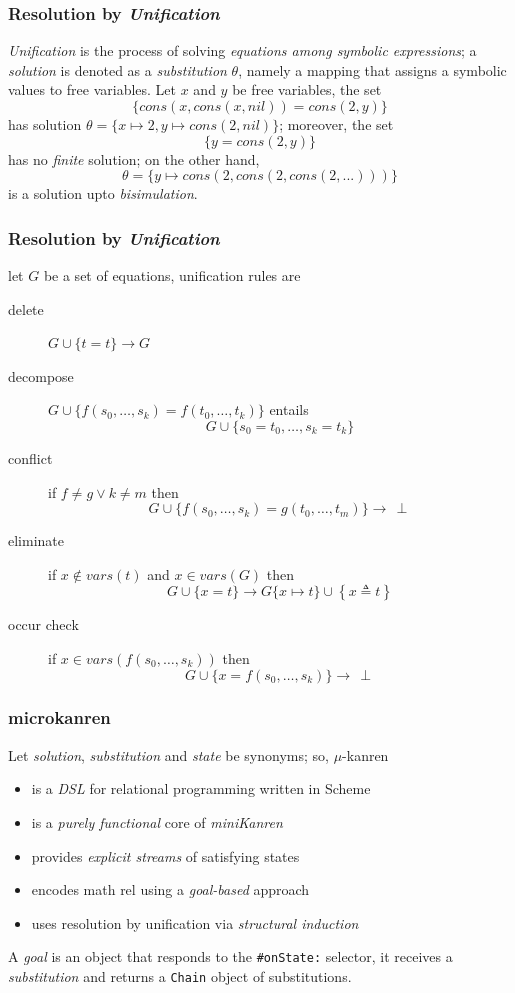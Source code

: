 \documentclass[9pt]{beamer}
\begin{document}
\begin{frame}[fragile]
\frametitle{Resolution by \textit{Unification}}

\textit{Unification} is the process of solving \textit{equations among symbolic
expressions}; a \textit{solution} is denoted as a \textit{substitution}
$\theta$, namely a mapping that assigns a symbolic values to free variables.
\vfill
Let $x$ and $y$ be free variables, the set
$$\lbrace cons(x,cons(x,nil)) = cons(2,y)\rbrace$$
has solution $\theta = \lbrace x \mapsto 2, y \mapsto cons(2,nil) \rbrace$;
moreover, the set
$$ \lbrace y = cons(2,y) \rbrace $$
has no \textit{finite} solution; on the other hand,
$$\theta = \lbrace y \mapsto cons(2,cons(2,cons(2,...))) \rbrace$$
is a solution upto \textit{bisimulation}.
\end{frame}

\begin{frame}[fragile]
\frametitle{Resolution by \textit{Unification}}
let $G$ be a set of equations, unification rules are
\begin{description}
\item[delete] $G \cup \lbrace t = t \rbrace \rightarrow G$
\item[decompose] $G \cup \lbrace f(s_{0}, \ldots, s_{k}) = f(t_{0}, \ldots, t_{k})\rbrace$ entails
$$G \cup \lbrace s_{0}=t_{0},\ldots, s_{k}=t_{k} \rbrace$$
\item[conflict] if $f\neq g \vee k\neq m$ then $$G \cup \lbrace f(s_{0}, \ldots, s_{k}) = g(t_{0}, \ldots, t_{m})\rbrace \rightarrow \,\perp$$
\item[eliminate] if $x \not\in vars(t)$ and $x \in vars(G)$ then $$G \cup \lbrace x = t\rbrace \rightarrow G\lbrace x \mapsto t\rbrace \cup \left\lbrace x \triangleq t\right\rbrace $$
\item[occur check] if $x \in vars(f(s_{0},\ldots,s_{k}))$ then $$G \cup \lbrace x = f(s_{0}, \ldots, s_{k})\rbrace \rightarrow \,\perp$$
\end{description}
\end{frame}

\begin{frame}[fragile]
\frametitle{microkanren}
Let \textit{solution}, \textit{substitution} and \textit{state} be synonyms; so, $\mu$-kanren
\begin{itemize}
\item is a \textit{DSL} for relational programming written in Scheme
\item is a \textit{purely functional} core of \textit{miniKanren}
\item provides \textit{explicit streams} of satisfying states
\item encodes math rel using a \textit{goal-based} approach
\item uses resolution by unification via \textit{structural induction}
\end{itemize}
\vfill
A \textit{goal} is an object that responds to the \verb|#onState:| selector, it
receives a \textit{substitution} and returns a \verb|Chain| object of
substitutions.
\end{frame}
\end{document}
